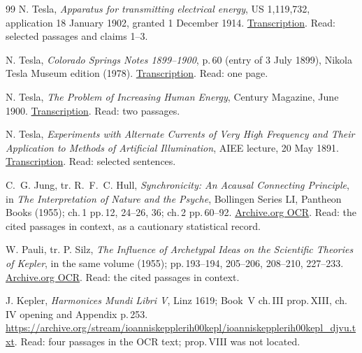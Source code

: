 \begin{thebibliography}{99}
N. Tesla, \emph{Apparatus for transmitting electrical energy}, US 1,119,732,
application 18 January 1902, granted 1 December 1914.
\href{https://teslauniverse.com/nikola-tesla/patents/us-patent-1119732-apparatus-transmitting-electrical-energy}{Transcription}.
Read: selected passages and claims 1--3.

N. Tesla, \emph{Colorado Springs Notes 1899--1900}, p.\,60 (entry of 3 July
1899), Nikola Tesla Museum edition (1978).
\href{https://teslauniverse.com/nikola-tesla/books/nikola-tesla-colorado-springs-notes-1899-1900/60}{Transcription}.
Read: one page.

N. Tesla, \emph{The Problem of Increasing Human Energy}, Century Magazine,
June 1900.
\href{https://teslauniverse.com/nikola-tesla/articles/problem-increasing-human-energy}{Transcription}.
Read: two passages.

N. Tesla, \emph{Experiments with Alternate Currents of Very High Frequency and
Their Application to Methods of Artificial Illumination}, AIEE lecture,
20 May 1891.
\href{https://teslauniverse.com/nikola-tesla/lectures/experiments-alternate-currents-very-high-frequency-and-their-application}{Transcription}.
Read: selected sentences.

C.~G. Jung, tr. R.~F.~C. Hull, \emph{Synchronicity: An Acausal Connecting
Principle}, in \emph{The Interpretation of Nature and the Psyche}, Bollingen
Series LI, Pantheon Books (1955); ch.\,1 pp.\,12, 24--26, 36; ch.\,2
pp.\,60--92.
\href{https://archive.org/stream/x-the-interpretation-of-nature-and-the-psyche/x_THE\%20INTERPRETATION\%20OF\%20NATURE\%20AND\%20THE\%20PSYCHE_djvu.txt}{Archive.org
OCR}.
Read: the cited passages in context, as a cautionary statistical record.

W. Pauli, tr. P. Silz, \emph{The Influence of Archetypal Ideas on the
Scientific Theories of Kepler}, in the same volume (1955); pp.\,193--194,
205--206, 208--210, 227--233.
\href{https://archive.org/stream/x-the-interpretation-of-nature-and-the-psyche/x_THE\%20INTERPRETATION\%20OF\%20NATURE\%20AND\%20THE\%20PSYCHE_djvu.txt}{Archive.org
OCR}.
Read: the cited passages in context.

J. Kepler, \emph{Harmonices Mundi Libri V}, Linz 1619; Book~V ch.\,III
prop.\,XIII, ch.\,IV opening and Appendix p.\,253.
\url{https://archive.org/stream/ioanniskepplerih00kepl/ioanniskepplerih00kepl_djvu.txt}.
Read: four passages in the OCR text; prop.\,VIII was not located.


\end{thebibliography}
